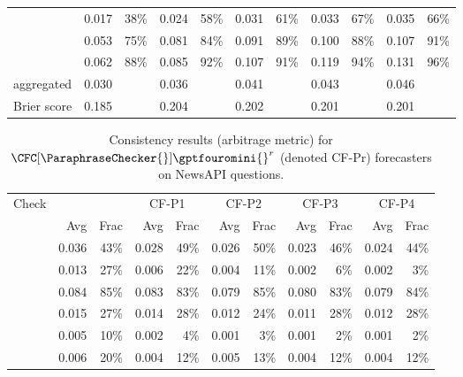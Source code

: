 {\begin{table}[htbp]
\begin{tabular}{lrrrrrrrrrr}
\AndOrChecker{} & 0.017 & 38\% & 0.024 & 58\% & 0.031 & 61\% & 0.033 & 67\% & 0.035 & 66\% \\
\ButChecker{} & 0.053 & 75\% & 0.081 & 84\% & 0.091 & 89\% & 0.100 & 88\% & 0.107 & 91\% \\
\CondChecker{} & 0.062 & 88\% & 0.085 & 92\% & 0.107 & 91\% & 0.119 & 94\% & 0.131 & 96\% \\
aggregated & 0.030 &  & 0.036 &  & 0.041 &  & 0.043 &  & 0.046 &  \\
Brier score & 0.185 &  & 0.204 &  & 0.202 &  & 0.201 &  & 0.201 &  \\
\bottomrule
\end{tabular}
\label{tab:cf-nx}
\end{table}


\begin{table}[htbp]
\caption{Consistency results (arbitrage metric) for $\CFC[\ParaphraseChecker{}]{\gptfouromini{}}^r$ (denoted CF-Pr) forecasters on NewsAPI questions.}
\begin{tabular}{lrrrrrrrrrr}
\toprule
Check & \multicolumn{2}{c}{\gptfouromini{}} & \multicolumn{2}{c}{CF-P1} & \multicolumn{2}{c}{CF-P2} & \multicolumn{2}{c}{CF-P3} & \multicolumn{2}{c}{CF-P4} \\
 & Avg & Frac & Avg & Frac & Avg & Frac & Avg & Frac & Avg & Frac \\
\midrule
\NegChecker{} & 0.036 & 43\% & 0.028 & 49\% & 0.026 & 50\% & 0.023 & 46\% & 0.024 & 44\% \\
\ParaphraseChecker{} & 0.013 & 27\% & 0.006 & 22\% & 0.004 & 11\% & 0.002 & 6\% & 0.002 & 3\% \\
\CondCondChecker{} & 0.084 & 85\% & 0.083 & 83\% & 0.079 & 85\% & 0.080 & 83\% & 0.079 & 84\% \\
\ExpectedEvidenceChecker{} & 0.015 & 27\% & 0.014 & 28\% & 0.012 & 24\% & 0.011 & 28\% & 0.012 & 28\% \\
\ConsequenceChecker{} & 0.005 & 10\% & 0.002 & 4\% & 0.001 & 3\% & 0.001 & 2\% & 0.001 & 2\% \\
\AndChecker{} & 0.006 & 20\% & 0.004 & 12\% & 0.005 & 13\% & 0.004 & 12\% & 0.004 & 12\% \\

\end{tabular}
\end{table}}
